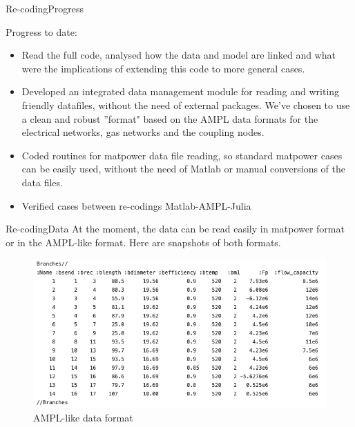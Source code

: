 \documentclass[handout]{beamer}
\begin{document}
\begin{frame}[t]{Re-coding}{Progress}

Progress to date:
\begin{itemize}
  \item Read the full code, analysed how the data and model are linked and what were the implications of extending this code to more general cases.
  \item Developed an integrated data management module for reading and writing friendly datafiles, without the need of external packages. We've chosen to use a clean and robust ''format" based on the AMPL data formats for the electrical networks, gas networks and the coupling nodes.
  \item Coded routines for matpower data file reading, so standard matpower cases can be easily used, without the need of Matlab or manual conversions of the data files.
  \item Verified cases between re-codings Matlab-AMPL-Julia
\end{itemize}

\end{frame}

\begin{frame}[t]{Re-coding}{Data}
At the moment, the data can be read easily in matpower format or in the AMPL-like format. Here are snapshots of both formats.

\begin{figure}
\begin{center}
\includegraphics[height=0.55\textheight]{AMPLlike2.png}
\end{center}
\caption{AMPL-like data format}\label{fig:ampllike}
\end{figure}
\end{frame}
\end{document}
